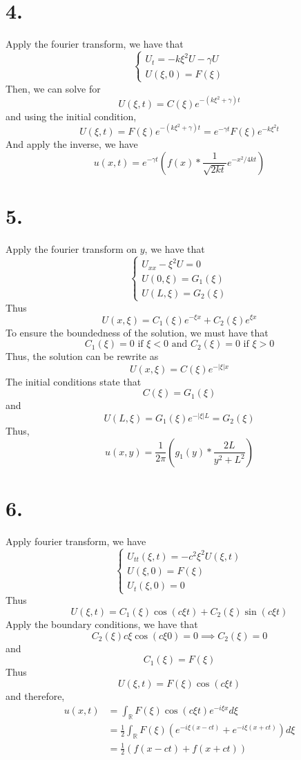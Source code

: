 \documentclass[11pt]{article}
\theoremstyle{mystyle}
\theoremstyle{definition}
\begin{document}
\section*{4.}
Apply the fourier transform, we have that 
\[
  \begin{cases}
    U_t = -k\xi^2 U - \gamma U \\
    U(\xi,0) = F(\xi) 
  \end{cases}
\]
Then, we can solve for 
\[
  U(\xi, t) = C(\xi) e^{-(k \xi^2 + \gamma)t}
\]
and using the initial condition, 
\[
  U(\xi, t) = F(\xi) e^{-(k \xi^2 + \gamma)t} = e^{-\gamma t} F(\xi) e^{-k\xi^2 t}
\]
And apply the inverse, we have 
\[
  u(x,t) = e^{-\gamma t} \left(f(x) * \displaystyle\frac{1}{\sqrt{2kt}} e^{-x^2/4kt} \right) 
\]
\newpage
\section*{5.}
Apply the fourier transform on $y$, we have that 
\[
  \begin{cases}
    U_{xx} -\xi^2 U = 0 \\
    U(0,\xi) = G_1(\xi) \\
    U(L, \xi) = G_2(\xi)
  \end{cases}
\]
Thus 
\[
  U(x, \xi) = C_1(\xi) e^{-\xi x} + C_2(\xi) e^{\xi x}
\]
To ensure the boundedness of the solution, we must have that 
\[
  C_1(\xi) = 0 \text{ if } \xi < 0 \text{ and } C_2(\xi) = 0 \text{ if } \xi > 0
\]
Thus, the solution can be rewrite as 
\[
  U(x,\xi) = C(\xi) e^{-|\xi|x}
\]
The initial conditions state that 
\[
  C(\xi) = G_1(\xi) 
\]
and 
\[
  U(L,\xi) = G_1(\xi) e^{-|\xi| L} = G_2(\xi)
\]
Thus, 
\[
  u(x,y) = \displaystyle\frac{1}{2\pi} \left(g_1(y) * \displaystyle\frac{2L}{y^2 + L^2}\right)
\]
\newpage
\section*{6.}
Apply fourier transform, we have 
\[
  \begin{cases}
    U_{tt}(\xi, t) =  - c^2 \xi^2 U(\xi, t) \\
    U(\xi, 0) = F(\xi) \\
    U_t(\xi, 0) = 0
  \end{cases}
\]
Thus 
\[
  U(\xi, t) = C_1(\xi) \cos(c\xi t) + C_2(\xi) \sin(c\xi t)
\]
Apply the boundary conditions, we have that 
\[
  C_2(\xi) c\xi \cos(c\xi 0) = 0 \implies C_2(\xi) = 0
\]
and 
\[
  C_1(\xi) = F(\xi)
\]
Thus 
\[
  U(\xi, t) = F(\xi) \cos(c\xi t)
\]
and therefore,
\begin{align*}  
  u(x,t)
  &= \int_\mathbb{R} F(\xi) \cos(c\xi t) e^{-i\xi x} d\xi \\
  &= \displaystyle\frac{1}{2} \int_\mathbb{R} F(\xi) (e^{-i\xi(x-ct)} + e^{-i\xi(x+ct)}) d\xi \\
  &= \displaystyle\frac{1}{2} \left(f(x-ct) + f(x+ct) \right)
\end{align*}
\newpage
\end{document}
